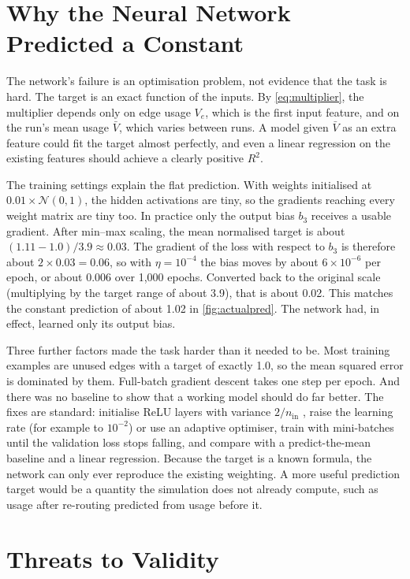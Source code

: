 \documentclass[12pt]{report}
\begin{document}
\section{Why the Neural Network Predicted a Constant}

The network's failure is an optimisation problem, not evidence that the task is hard. The target is an exact function of the inputs. By \cref{eq:multiplier}, the multiplier depends only on edge usage $V_e$, which is the first input feature, and on the run's mean usage $\bar{V}$, which varies between runs. A model given $\bar{V}$ as an extra feature could fit the target almost perfectly, and even a linear regression on the existing features should achieve a clearly positive $R^2$.

The training settings explain the flat prediction. With weights initialised at $0.01 \times \mathcal{N}(0,1)$, the hidden activations are tiny, so the gradients reaching every weight matrix are tiny too. In practice only the output bias $b_3$ receives a usable gradient. After min--max scaling, the mean normalised target is about $(1.11 - 1.0)/3.9 \approx 0.03$. The gradient of the loss with respect to $b_3$ is therefore about $2 \times 0.03 = 0.06$, so with $\eta = 10^{-4}$ the bias moves by about $6 \times 10^{-6}$ per epoch, or about 0.006 over 1,000 epochs. Converted back to the original scale (multiplying by the target range of about 3.9), that is about 0.02. This matches the constant prediction of about 1.02 in \cref{fig:actualpred}. The network had, in effect, learned only its output bias.

Three further factors made the task harder than it needed to be. Most training examples are unused edges with a target of exactly 1.0, so the mean squared error is dominated by them. Full-batch gradient descent takes one step per epoch. And there was no baseline to show that a working model should do far better. The fixes are standard: initialise ReLU layers with variance $2/n_{\text{in}}$ \citep{he2015delving}, raise the learning rate (for example to $10^{-2}$) or use an adaptive optimiser, train with mini-batches until the validation loss stops falling, and compare with a predict-the-mean baseline and a linear regression. Because the target is a known formula, the network can only ever reproduce the existing weighting. A more useful prediction target would be a quantity the simulation does not already compute, such as usage after re-routing predicted from usage before it.

\section{Threats to Validity}
\label{sec:validity}
\end{document}
